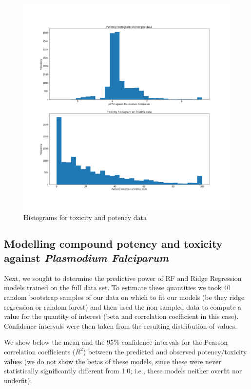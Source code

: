 \documentclass[journal=jacsat,manuscript=article]{achemso}
\begin{document}
\begin{figure}[h!]
\centering
\includegraphics[width=\textwidth]{fig1_hists.png}
\caption{Histograms for toxicity and potency data}
\label{fig:hist}
\end{figure}

\subsection*{Modelling compound potency and toxicity against {\it Plasmodium Falciparum}
}

Next, we sought to determine the predictive power of RF and Ridge Regression models trained on the full data set.  To estimate these quantities we took 40 random bootstrap samples of our data on which to fit our models (be they ridge regression or random forest) and then used the non-sampled data to compute a value for the quantity of interest (beta and correlation coefficient in this case). Confidence intervals were then taken from the resulting distribution of values.

We show below the mean and the 95\% confidence intervals for the Pearson correlation coefficients ($R^2$) between the predicted and observed potency/toxicity values (we do not show the betas of these models, since these were never statistically significantly different from 1.0; i.e., these models neither overfit nor underfit).
\end{document}
